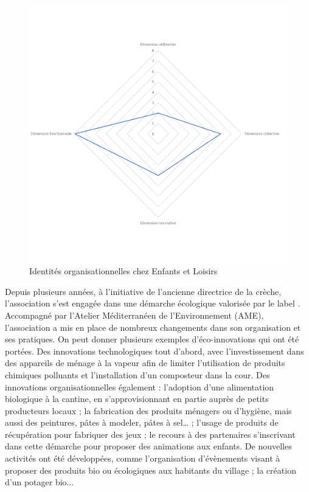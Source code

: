         \begin{figure}[h]
            \caption{Identités organisationnelles chez Enfants et Loisirs}
            \label{figure:dimenfantsetloisirs}
            \includegraphics[width=\linewidth]{fig/radars/E&L.png}
        \end{figure}

        Depuis plusieurs années, à l’initiative de l’ancienne directrice de la crèche, l’association s’est engagée dans une démarche écologique valorisée par le label . Accompagné par l’Atelier Méditerranéen de l’Environnement (AME), l’association a mis en place de nombreux changements dans son organisation et ses pratiques. On peut donner plusieurs exemples d’éco-innovations qui ont été portées. Des innovations technologiques tout d’abord, avec l’investissement dans des appareils de ménage à la vapeur afin de limiter l’utilisation de produits chimiques polluants et l’installation d’un composteur dans la cour. Des innovations organisationnelles également : l’adoption d’une alimentation biologique à la cantine, en s’approvisionnant en partie auprès de petits producteurs locaux ; la fabrication  des produits ménagers ou d’hygiène, mais aussi des peintures, pâtes à modeler, pâtes à sel… ; l’usage de produits de récupération pour fabriquer des jeux ; le recours à des partenaires s’inscrivant dans cette démarche pour proposer des animations aux enfants. De nouvelles activités ont été développées, comme l’organisation d’évènements visant à proposer des produits bio ou écologiques aux habitants du village ; la création d’un potager bio...

